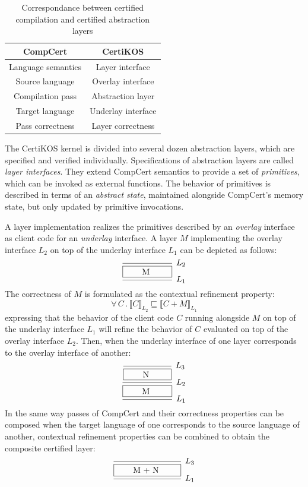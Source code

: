 \documentclass[11pt,oneside,draft]{book}
\theoremstyle{definition}
\newcommand{\refby}{\sqsubseteq} %
\begin{document}
\begin{table}
  \centering
  \begin{tabular}{c@{\qquad}c}
    \hline
    CompCert & CertiKOS \\
    \hline
    Language semantics & Layer interface \\
    Source language & Overlay interface \\
    Compilation pass & Abstraction layer \\
    Target language & Underlay interface \\
    Pass correctness & Layer correctness \\
    \hline
  \end{tabular}
  \caption{
    Correspondance between certified compilation
    and certified abstraction layers
  }
  \label{tbl:compccal}
\end{table}

The CertiKOS kernel is divided into several dozen abstraction layers,
which are specified and verified individually.
Specifications of abstraction layers
are called \emph{layer interfaces}.
They extend CompCert semantics
to provide a set of \emph{primitives},
which can be invoked as
external functions.
The behavior of primitives is described in terms of
an \emph{abstract state},
maintained alongside CompCert's memory state,
but only updated by primitive invocations.

A layer implementation
realizes the primitives described by an \emph{overlay} interface
as client code for an \emph{underlay} interface.
A layer $M$ implementing the overlay interface $L_2$
on top of the underlay interface $L_1$ can be depicted as follows:
\[
  \begin{prooftree}
    \infer0[$L_2$]{\fbox{\qquad M \qquad}}
    \infer1[$L_1$]{}
  \end{prooftree}
\]
The correctness of $M$ is formulated as
the contextual refinement property:
\[
  \forall \, C \, . \,
  \llbracket C \rrbracket_{L_2} \refby
  \llbracket C + M \rrbracket_{L_1}
\]
expressing that the behavior of the client code $C$
running alongside $M$ on top of the underlay interface $L_1$
will refine the behavior of $C$
evaluated on top of the overlay interface $L_2$.
Then,
when the underlay interface of one layer
corresponds to the overlay interface of another:
\[
  \begin{prooftree}
    \infer0[$L_3$]{\fbox{\qquad N \qquad}}
    \infer1[$L_2$]{\fbox{\qquad M \qquad}}
    \infer1[$L_1$]{}
  \end{prooftree}
\]
In the same way passes of CompCert and their correctness properties
can be composed when the target language of one corresponds to
the source language of another,
contextual refinement properties can be combined
to obtain the composite certified layer:
\[
  \begin{prooftree}
    \infer0[$L_3$]{\fbox{\qquad M + N \qquad}}
    \infer1[$L_1$]{}
  \end{prooftree}
\]
\end{document}
